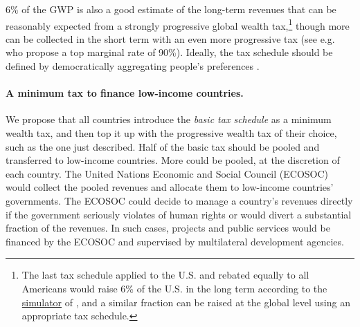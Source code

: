 \documentclass[12pt,english]{article}
\begin{document}
6\% of the GWP is also a good estimate of the long-term revenues that can be reasonably expected from a strongly progressive global wealth tax,\footnote{The last tax schedule applied to the U.S. and rebated equally to all Americans would raise 6\% of the U.S. in the long term according to the \href{https://thomasblanchet.github.io/wealth-tax/}{simulator} of \citet{blanchet_uncovering_2022}, and a similar fraction can be raised at the global level using an appropriate tax schedule.} though more can be collected in the short term with an even more progressive tax (see e.g. \citealp{chancel_world_2022} who propose a top marginal rate of 90\%). 
Ideally, the tax schedule should be defined by democratically aggregating people's preferences \citep{fabre_french_2022}. 

\paragraph{A minimum tax to finance low-income countries.} We propose that all countries introduce the \textit{basic tax schedule} as a minimum wealth tax, and then top it up with the progressive wealth tax of their choice, such as the one just described. 
Half of the basic tax %
should be pooled and transferred to low-income countries. More could be pooled, at the discretion of each country. The United Nations Economic and Social Council (ECOSOC) would collect the pooled revenues and allocate them to low-income countries' governments. The ECOSOC could decide to manage a country's revenues directly if the government seriously violates of human rights or would divert a substantial fraction of the revenues. In such cases, projects and public services would be financed by the ECOSOC and supervised by multilateral development agencies. 
\end{document}
